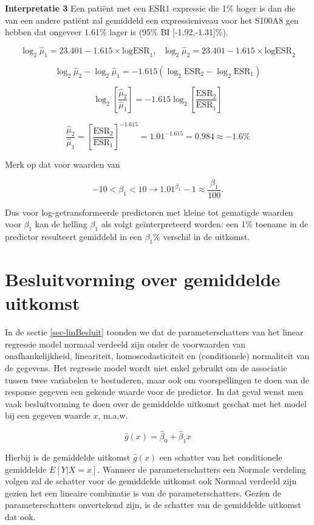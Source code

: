 \documentclass[
  dutch,
  letterpaper,
  12pt]{book}
\theoremstyle{definition}
\theoremstyle{definition}
\theoremstyle{definition}
\theoremstyle{remark}
\begin{document}
\textbf{Interpretatie 3} Een patiënt met een ESR1 expressie die 1\%
hoger is dan die van een andere patiënt zal gemiddeld een
expressieniveau voor het S100A8 gen hebben dat ongeveer 1.61\% lager is
(95\% BI {[}-1.92,-1.31{]}\%).

\[\log_2 \hat\mu_1=23.401  -1.615 \times \text{logESR}_1,\text{ } \log_2 \hat\mu_2=23.401  -1.615 \times \text{logESR}_2 \]

\[\log_2 \hat\mu_2-\log_2 \hat \mu_1=  -1.615 (\log_2 \text{ESR}_2-\log_2 \text{ESR}_1) \]

\[\log_2 \left[\frac{\hat\mu_2}{\hat\mu_1}\right]=  -1.615 \log_2\left[\frac{ \text{ESR}_2}{\text{ESR}_1}\right] \]

\[\frac{\hat\mu_2}{\hat\mu_1}=\left[\frac{ \text{ESR}_2}{\text{ESR}_1}\right]^{-1.615}=1.01^ {-1.615} =0.984 \approx -1.6\%\]

Merk op dat voor waarden van

\[−10< \beta_1<10 \rightarrow 1.01 ^{\beta_1}−1 \approx \frac{\beta_1}{100}.\]

Dus voor log-getransformeerde predictoren met kleine tot gematigde
waarden voor \(\beta_1\) kan de helling \(\beta_1\) als volgt
geïnterpreteerd worden: een 1\% toename in de predictor resulteert
gemiddeld in een \(\beta_1\)\% verschil in de uitkomst.

\section{Besluitvorming over gemiddelde
uitkomst}\label{besluitvorming-over-gemiddelde-uitkomst}

In de sectie \ref{sec-linBesluit} toonden we dat de parameterschatters
van het linear regressie model normaal verdeeld zijn onder de
voorwaarden van onafhankelijkheid, lineariteit, homoscedasticiteit en
(conditionele) normaliteit van de gegevens. Het regressie model wordt
niet enkel gebruikt om de associatie tussen twee variabelen te
bestuderen, maar ook om voorspellingen te doen van de response gegeven
een gekende waarde voor de predictor. In dat geval wenst men vaak
besluitvorming te doen over de gemiddelde uitkomst geschat met het model
bij een gegeven waarde \(x\), m.a.w.

\[\hat{g}(x)= \hat{\beta}_0 + \hat{\beta}_1 x\]

Hierbij is de gemiddelde uitkomst \(\hat{g}(x)\) een schatter van het
conditionele gemiddelde \(E[Y\vert X=x]\). Wanneer de parameterschatters
een Normale verdeling volgen zal de schatter voor de gemiddelde uitkomst
ook Normaal verdeeld zijn gezien het een lineaire combinatie is van de
parameterschatters. Gezien de parameterschatters onvertekend zijn, is de
schatter van de gemiddelde uitkomst dat ook.
\end{document}
